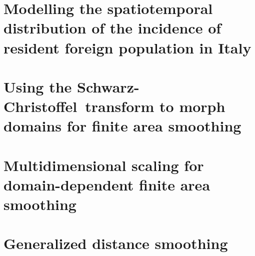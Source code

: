 \documentclass[12pt]{report}
\newcommand{\sch}{Schwarz-Christoffel}
\begin{document}


\chapter{Modelling the spatiotemporal distribution of the incidence of resident foreign population in Italy}



\chapter{Using the \sch\ transform to morph domains for finite area smoothing}
%



\chapter{Multidimensional scaling for domain-dependent finite area smoothing}



\chapter{Generalized distance smoothing}
%
\end{document}
